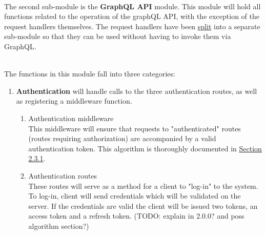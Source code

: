 \documentclass[../../main.tex]{subfiles}
\begin{document}
\noindent \\ The second sub-module is the \textbf{GraphQL API} module.
This module will hold all functions related to the operation of the
graphQL API, with the exception of the request handlers themselves.
The request handlers have been \underline{split} into a separate
sub-module so that they can be used without having to invoke them
via GraphQL.

\noindent \\ The functions in this module fall into three categories:

\begin{enumerate}
    \item \textbf{Authentication} will handle calls to the three
          authentication routes, as well as registering a middleware function.
          \begin{enumerate}
              \item Authentication middleware\\
                    This middleware will ensure that requests to "authenticated"
                    routes (routes requiring authorization) are accompanied by a
                    valid authentication token. This algorithm is thoroughly
                    documented in \underline{Section 2.3.1}.

              \item Authentication routes\\
                    These routes will serve as a method for a client
                    to "log-in" to the system. To log-in, client will send
                    credentials which will be validated on the server. If
                    the credentials are valid the client will be issued
                    two tokens, an access token and a refresh token.
                    (TODO: explain in 2.0.0? and poss algorithm section?)
          \end{enumerate}


\end{enumerate}
\end{document}
